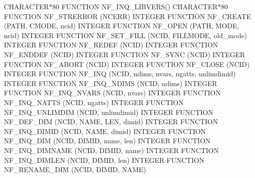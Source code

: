 \begin{DoxyCode}
CHARACTER*80 FUNCTION  NF\_INQ\_LIBVERS()
CHARACTER*80 FUNCTION  NF\_STRERROR  (NCERR)
INTEGER FUNCTION  NF\_CREATE         (PATH, CMODE, ncid)
INTEGER FUNCTION  NF\_OPEN           (PATH, MODE, ncid)
INTEGER FUNCTION  NF\_SET\_FILL       (NCID, FILLMODE, old\_mode)
INTEGER FUNCTION  NF\_REDEF          (NCID)
INTEGER FUNCTION  NF\_ENDDEF         (NCID)
INTEGER FUNCTION  NF\_SYNC           (NCID)
INTEGER FUNCTION  NF\_ABORT          (NCID)
INTEGER FUNCTION  NF\_CLOSE          (NCID)
INTEGER FUNCTION  NF\_INQ            (NCID, ndims, nvars, ngatts,
                                     unlimdimid)
INTEGER FUNCTION  NF\_INQ\_NDIMS      (NCID, ndims)
INTEGER FUNCTION  NF\_INQ\_NVARS      (NCID, nvars)
INTEGER FUNCTION  NF\_INQ\_NATTS      (NCID, ngatts)
INTEGER FUNCTION  NF\_INQ\_UNLIMDIM   (NCID, unlimdimid)
INTEGER FUNCTION  NF\_DEF\_DIM        (NCID, NAME, LEN, dimid)
INTEGER FUNCTION  NF\_INQ\_DIMID      (NCID, NAME, dimid)
INTEGER FUNCTION  NF\_INQ\_DIM        (NCID, DIMID, name, len)
INTEGER FUNCTION  NF\_INQ\_DIMNAME    (NCID, DIMID, name)
INTEGER FUNCTION  NF\_INQ\_DIMLEN     (NCID, DIMID, len)
INTEGER FUNCTION  NF\_RENAME\_DIM     (NCID, DIMID, NAME)


\end{DoxyCode}
